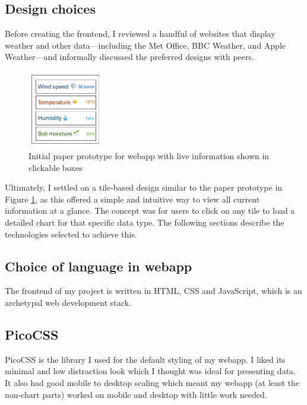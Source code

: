 \subsection{Design choices}

Before creating the frontend, I reviewed a handful of websites that display
weather and other data—including the Met Office, BBC Weather, and Apple
Weather—and informally discussed the preferred designs with peers.

\begin{figure}[H]
    \centering
    \includegraphics[width=0.3\textwidth]{contents/part-3/fig3/paper-prototype.png}
    \caption{Initial paper prototype for webapp with live information shown in clickable boxes}
    \label{fig:paper-prototype}
\end{figure}

Ultimately, I settled on a tile-based design similar to the paper prototype in
Figure \ref{fig:paper-prototype}, as this offered a simple and intuitive way to
view all current information at a glance. The concept was for users to click on
any tile to load a detailed chart for that specific data type. The following
sections describe the technologies selected to achieve this. 

\subsection{Choice of language in webapp}

The frontend of my project is written in HTML, CSS and JavaScript, which is an
archetypal web development stack.

\subsection{PicoCSS}

PicoCSS is the library I used for the default styling of my webapp. I liked its
minimal and low distraction look which I thought was ideal for presenting data.
It also had good mobile to desktop scaling which meant my webapp (at least the
non-chart parts) worked on mobile and desktop with little work needed.

